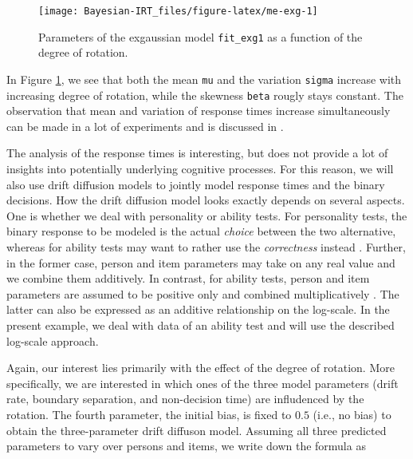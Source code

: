 \documentclass[jss]{jss}
\begin{document}
\begin{CodeChunk}
\begin{figure}

{\centering \texttt{[image: Bayesian-IRT\_files/figure-latex/me-exg-1]} 

}

\caption[Parameters of the exgaussian model \texttt{fit\_exg1} as a function of the degree of rotation]{Parameters of the exgaussian model \texttt{fit\_exg1} as a function of the degree of rotation.}\label{fig:me-exg}
\end{figure}
\end{CodeChunk}

In Figure \ref{fig:me-exg}, we see that both the mean \texttt{mu} and
the variation \texttt{sigma} increase with increasing degree of
rotation, while the skewness \texttt{beta} rougly stays constant. The
observation that mean and variation of response times increase
simultaneously can be made in a lot of experiments and is discussed in
\citet{wagenmakers2007}.

The analysis of the response times is interesting, but does not provide
a lot of insights into potentially underlying cognitive processes. For
this reason, we will also use drift diffusion models to jointly model
response times and the binary decisions. How the drift diffusion model
looks exactly depends on several aspects. One is whether we deal with
personality or ability tests. For personality tests, the binary response
to be modeled is the actual \emph{choice} between the two alternative,
whereas for ability tests may want to rather use the \emph{correctness}
instead \citep{tuerlinckx2005, vandermaas2011}. Further, in the former
case, person and item parameters may take on any real value and we
combine them additively. In contrast, for ability tests, person and item
parameters are assumed to be positive only and combined multiplicatively
\citep{vandermaas2011}. The latter can also be expressed as an additive
relationship on the log-scale. In the present example, we deal with data
of an ability test and will use the described log-scale approach.

Again, our interest lies primarily with the effect of the degree of
rotation. More specifically, we are interested in which ones of the
three model parameters (drift rate, boundary separation, and
non-decision time) are infludenced by the rotation. The fourth
parameter, the initial bias, is fixed to \(0.5\) (i.e., no bias) to
obtain the three-parameter drift diffuson model. Assuming all three
predicted parameters to vary over persons and items, we write down the
formula as
\end{document}

